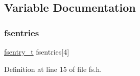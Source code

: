 \subsection{Variable Documentation}
\mbox{\label{a00137_a6b46131164b26e476762930c9aae4319_a6b46131164b26e476762930c9aae4319}} 
\subsubsection{\texorpdfstring{fsentries}{fsentries}}
{\footnotesize\ttfamily \hyperlink{a00137_a9ccf6560e8aebea3e4402a31e8c0f46b_a9ccf6560e8aebea3e4402a31e8c0f46b}{fsentry\+\_\+t} fsentries\mbox{[}4\mbox{]}}



Definition at line 15 of file fs.\+h.

